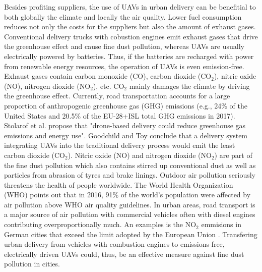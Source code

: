 Besides profiting suppliers,
the use of UAVs in urban delivery can be benefitial to both globally the climate and locally the air quality.
Lower fuel consumption reduces not only the costs for the suppliers but also the amount of exhaust gases.
Conventional delivery trucks with cobustion engines emit exhaust gases that drive the greenhouse effect and cause fine dust pollution,
whereas UAVs are usually electrically powered by batteries.
Thus, if the batteries are recharged with power from renewable energy resources, the operation of UAVs is even emission-free.
Exhaust gases contain carbon monoxide ($\text{CO}$), carbon dioxide ($\text{CO}_2$), nitric oxide ($\text{NO}$), nitrogen dioxide ($\text{NO}_2$), etc.\cite{Deutschlandfunk2017}
$\text{CO}_2$ mainly damages the climate by driving the greenhouse effect.
Currently, road transportation accounts for a large proportion of anthropogenic greenhouse gas (GHG) emissions
(e.g., 24\% of the United States \cite{EPA2019} and 20.5\% of the EU-28+ISL \cite{EEA2019} total GHG emissions in 2017).
Stolarof et al. \cite{Stolaroff2018} propose that "drone-based delivery could reduce greenhouse gas emissions and energy use".
Goodchild and Toy \cite{Goodchild2018} conclude that a delivery system integrating UAVs into the traditional delivery process 
would emit the least carbon dioxide ($\text{CO}_2$).
Nitric oxide ($\text{NO}$) and nitrogen dioxide ($\text{NO}_2$) are part of the fine dust pollution
which also contains stirred up conventional dust as well as particles from abrasion of tyres and brake linings.
Outdoor air pollution seriously threatens the health of people worldwide.
The World Health Organization (WHO) \cite{WHO2018} points out that in 2016, 
91\% of the world's population were affected by air pollution above WHO air quality guidelines. 
In urban areas, road transport is a major source of air pollution
with commercial vehicles often with diesel engines contributing overproportionally much. \cite{Bouton2017} 
An examples is the $\text{NO}_2$ emmisions in German cities that exceed the limit adopted by the European Union \cite{Wehrmann2019}.
Transfering urban delivery from vehicles with combustion engines to emissions-free, electrically driven UAVs could, thus, 
be an effective measure against fine dust pollution in cities.

